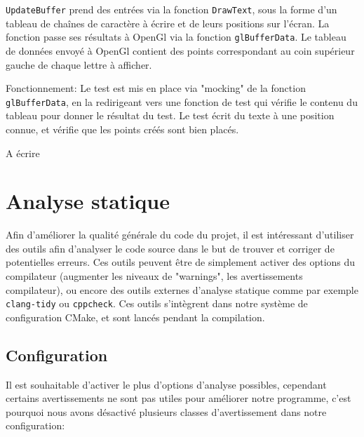 \texttt{UpdateBuffer} prend des entrées via la fonction
\texttt{DrawText}, sous la forme d'un tableau de chaînes de caractère à
écrire et de leurs positions sur l'écran. La fonction passe ses
résultats à OpenGl via la fonction \texttt{glBufferData}. Le tableau de
données envoyé à OpenGl contient des points correspondant au coin
supérieur gauche de chaque lettre à afficher.

Fonctionnement: Le test est mis en place via "mocking" de la fonction
\texttt{glBufferData}, en la redirigeant vers une fonction de test qui vérifie le
contenu du tableau pour donner le résultat du test. Le test écrit du
texte à une position connue, et vérifie que les points créés sont bien
placés.

\label{patchgenerategeometry}

A écrire

\newpage
\section{Analyse statique}\label{sec:sanal}

Afin d'améliorer la qualité générale du code du projet, il est
intéressant d'utiliser des outils afin d'analyser le code source dans le
but de trouver et corriger de potentielles erreurs. Ces outils peuvent
être de simplement activer des options du compilateur (augmenter les
niveaux de "warnings", les avertissements compilateur), ou encore des
outils externes d'analyse statique comme par exemple \texttt{clang-tidy}
ou \texttt{cppcheck}. Ces outils s'intègrent dans notre système de
configuration CMake, et sont lancés pendant la compilation.

\subsection{Configuration}\label{configuration}

Il est souhaitable d'activer le plus d'options d'analyse possibles,
cependant certains avertissements ne sont pas utiles pour améliorer
notre programme, c'est pourquoi nous avons désactivé plusieurs classes
d'avertissement dans notre configuration:

